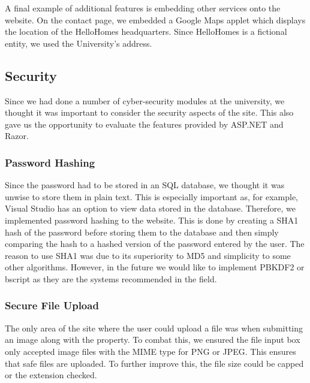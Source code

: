 \documentclass{article}
\begin{document}
        \par
            A final example of additional features is embedding other services onto the website.
            On the contact page, we embedded a Google Maps applet which displays the location of the HelloHomes headquarters.
            Since HelloHomes is a fictional entity, we used the University’s address.

    \subsection{Security}
        \par
            Since we had done a number of cyber-security modules at the university, we thought it was important to consider the security aspects of the site.
            This also gave us the opportunity to evaluate the features provided by ASP.NET and Razor.

        \subsubsection{Password Hashing}
            \par
                Since the password had to be stored in an SQL database, we thought it was unwise to store them in plain text.
                This is especially important as, for example, Visual Studio has an option to view data stored in the database.
                Therefore, we implemented password hashing to the website.
                This is done by creating a SHA1 hash of the password before storing them to the database and then simply comparing the hash to a hashed version of the password entered by the user.
                The reason to use SHA1 was due to its superiority to MD5 and simplicity to some other algorithms.
                However, in the future we would like to implement PBKDF2 or bscript as they are the systems recommended in the field.

        \subsubsection{Secure File Upload}
            \par
                The only area of the site where the user could upload a file was when submitting an image along with the property.
                To combat this, we ensured the file input box only accepted image files with the MIME type for PNG or JPEG.
                This ensures that safe files are uploaded.
                To further improve this, the file size could be capped or the extension checked.
\end{document}
